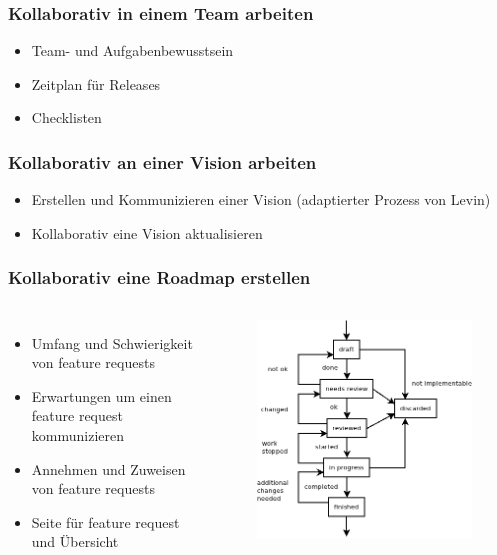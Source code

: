 \documentclass{beamer}
\begin{document}
\begin{frame}
\frametitle{Kollaborativ in einem Team arbeiten}
\begin{itemize}
 \item Team- und Aufgabenbewusstsein
 \item Zeitplan f\"ur Releases
 \item Checklisten
\end{itemize}
\end{frame}

\begin{frame}
\frametitle{Kollaborativ an einer Vision arbeiten}
\begin{itemize}
 \item Erstellen und Kommunizieren einer Vision (adaptierter Prozess von Levin)
 \item Kollaborativ eine Vision aktualisieren
\end{itemize}
\end{frame}

\begin{frame}
\frametitle{Kollaborativ eine Roadmap erstellen}
\begin{columns}
  \begin{itemize}
   \item Umfang und Schwierigkeit von feature requests
   \item Erwartungen um einen feature request kommunizieren
   \item Annehmen und Zuweisen von feature requests
   \item Seite f\"ur feature request und \"Ubersicht
  \end{itemize}
  \begin{figure}[h!]
   \centering
   \includegraphics[scale=0.4,keepaspectratio=true]{./featurerequeststates.png}
  \end{figure}
\end{columns}
\end{frame}
\end{document}
